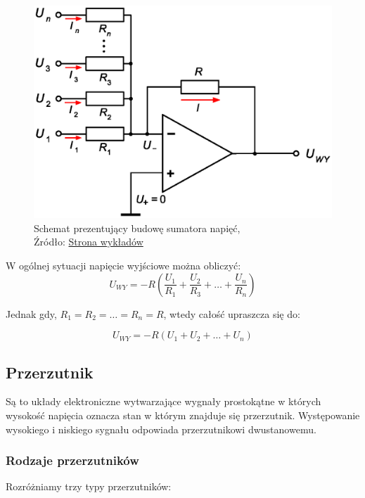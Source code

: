 \documentclass{article}
\begin{document}
        \begin{figure}[!ht]
          \centering
          \includegraphics[scale=0.70]{grafiki/sumujacy.eps}
          \caption{Schemat prezentujący budowę sumatora napięć,
          \\Źródło: \href{https://spe.if.uj.edu.pl/literatura}{Strona wykładów}}
          \label{fig2:sumujacy}
        \end{figure}
        \pagebreak

        W ogólnej sytuacji napięcie wyjściowe można obliczyć:
        \begin{equation}
          U_{WY} = - R(\frac{U_1}{R_1}+\frac{U_2}{R_3}+\dots+\frac{U_n}{R_n})
          \label{eq2:sumujacy}
        \end{equation}

        Jednak gdy, 
        $R_1 = R_2 = \dots = R_n = R$, wtedy całość upraszcza się do:

        \begin{equation}
          U_{WY} = - R(U_1 + U_2 + \dots + U_n)
        \end{equation}

    \subsection{Przerzutnik}
        Są to układy elektroniczne wytwarzające wygnały prostokątne w których wysokość napięcia oznacza stan w którym znajduje się przerzutnik. Występowanie wysokiego i niskiego sygnału odpowiada przerzutnikowi dwustanowemu.

      \subsubsection{Rodzaje przerzutników}
        Rozróżniamy trzy typy przerzutników:
\end{document}
